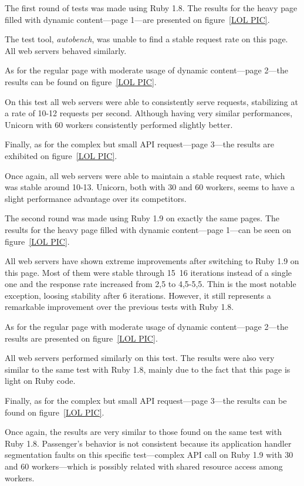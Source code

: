 The first round of tests was made using Ruby 1.8. The results for the heavy page filled with dynamic content---page 1---are presented on figure~\ref{LOL PIC}.

The test tool, \textit{autobench}, was unable to find a stable request rate on this page. All web servers behaved similarly. 

As for the regular page with moderate usage of dynamic content---page 2---the results can be found on figure~\ref{LOL PIC}.

On this test all web servers were able to consistently serve requests, stabilizing at a rate of 10-12 requests per second. Although having very similar performances, Unicorn with 60 workers consistently performed slightly better. 

Finally, as for the complex but small API request---page 3---the results are exhibited on figure~\ref{LOL PIC}.

Once again, all web servers were able to maintain a stable request rate, which was stable around 10-13. Unicorn, both with 30 and 60 workers, seems to have a slight performance advantage over its competitors.

The second round was made using Ruby 1.9 on exactly the same pages. The results for the heavy page filled with dynamic content---page 1---can be seen on figure~\ref{LOL PIC}.

All web servers have shown extreme improvements after switching to Ruby 1.9 on this page. Most of them were stable through 15~16 iterations instead of a single one and the response rate increased from 2,5 to 4,5-5,5. Thin is the most notable exception, loosing stability after 6 iterations. However, it still represents a remarkable improvement over the previous tests with Ruby 1.8.

As for the regular page with moderate usage of dynamic content---page 2---the results are presented on figure~\ref{LOL PIC}.

All web servers performed similarly on this test. The results were also very similar to the same test with Ruby 1.8, mainly due to the fact that this page is light on Ruby code.

Finally, as for the complex but small API request---page 3---the results can be found on figure~\ref{LOL PIC}.

Once again, the results are very similar to those found on the same test with Ruby 1.8. Passenger's behavior is not consistent because its application handler segmentation faults on this specific test---complex API call on Ruby 1.9 with 30 and 60 workers---which is possibly related with shared resource access among workers.

